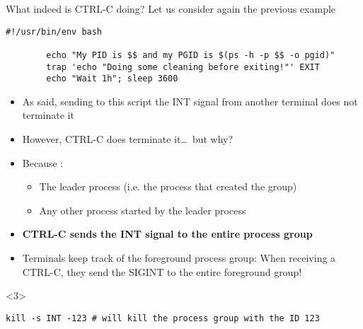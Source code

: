 \begin{frame}[fragile]{What indeed is CTRL-C doing?}
    \vspace{-3mm}
    Let us consider again the previous example
    \begin{lstlisting}[style=MyBash, numbers=none, aboveskip=2mm, belowskip=-4mm]
        #!/usr/bin/env bash

        echo "My PID is $$ and my PGID is $(ps -h -p $$ -o pgid)"
        trap 'echo "Doing some cleaning before exiting!"' EXIT
        echo "Wait 1h"; sleep 3600
    \end{lstlisting}
    \begin{overlayarea}{\textwidth}{0.5\textheight}
        \begin{itemize}
            \item<1-> As said, sending to this script the INT signal from another terminal does not terminate it
            \item<1-> However, CTRL-C does terminate it\ldots\ but why?
            \item<2-> Because :
                      \begin{itemize}
                          \item The leader process (i.e. the process that created the group)
                          \item Any other process started by the leader process
                      \end{itemize}
            \item<2-> \alert{\textbf{CTRL-C sends the INT signal to the entire process group}}
            \item<2-> Terminals keep track of the foreground process group: When receiving a CTRL-C, they send the SIGINT to the entire foreground group!
        \end{itemize}
        \begin{onlyenv}<3>
            \begin{lstlisting}[style=MyBash, numbers=none, xleftmargin=2mm, xrightmargin=2mm]
                kill -s INT -123 # will kill the process group with the ID 123
            \end{lstlisting}
        \end{onlyenv}
    \end{overlayarea}
\end{frame}

